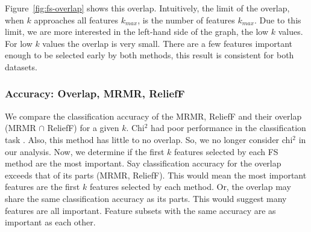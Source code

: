 \documentclass{article}
\begin{document}
Figure~\ref{fig:fs-overlap} shows this overlap.
Intuitively, the limit of the overlap, when $k$ approaches all features $k_{max}$, is the number of features $k_{max}$.
Due to this limit, we are more interested in the left-hand side of the graph, the low $k$ values.
For low $k$ values the overlap is very small.
There are a few features important enough to be selected early by both methods, this result is consistent for both datasets.

\subsubsection{Accuracy: Overlap, MRMR, ReliefF}
\label{sec:results-visualisation-accuracy-overlap-mrmr-reliefF}

We compare the classification accuracy of the MRMR, ReliefF and their overlap (MRMR $\cap$ ReliefF) for a given $k$.
Chi$^2$ had poor performance in the classification task \cite{wood2021feature}.
Also, this method has little to no overlap. So, we no longer consider chi$^2$ in our analysis.
Now, we determine if the first $k$ features selected by each FS method are the most important.
Say classification accuracy for the overlap exceeds that of its parts (MRMR, ReliefF).
This would mean the most important features are the first $k$ features selected by each method.
Or, the overlap may share the same classification accuracy as its parts.
This would suggest many features are all important.
Feature subsets with the same accuracy are as important as each other.
\end{document}
